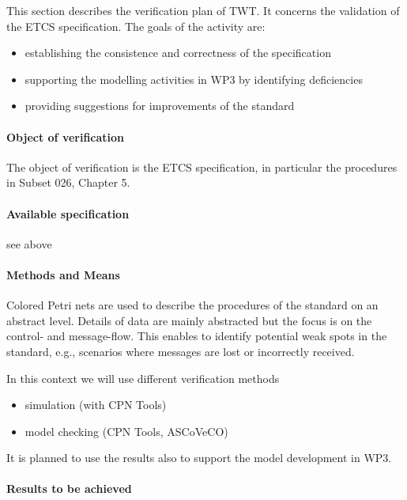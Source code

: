 This section describes the verification plan of TWT. It concerns
the validation of the ETCS specification. The goals of the activity are:

\begin{itemize}
\item establishing the consistence and correctness of the specification
\item supporting the modelling activities in WP3 by identifying deficiencies
\item providing suggestions for improvements of the standard
\end{itemize}

\paragraph{Object of verification}
\nl
The object of verification is the ETCS specification, in particular the procedures in Subset 026, Chapter 5.

\paragraph{Available specification}

see above

\paragraph{Methods and Means}

Colored Petri nets are used to describe the procedures of the standard on an abstract level. 
Details of data are mainly abstracted but the focus is on the control- and message-flow. This enables to identify potential weak spots
in the standard, e.g., scenarios where messages are lost or incorrectly received.

In this context we will use different verification methods
\begin{itemize}
\item simulation (with CPN Tools)
\item model checking (CPN Tools, ASCoVeCO)
\end{itemize}

It is planned to use the results also to support the model development in WP3.

\paragraph{Results to be achieved}

